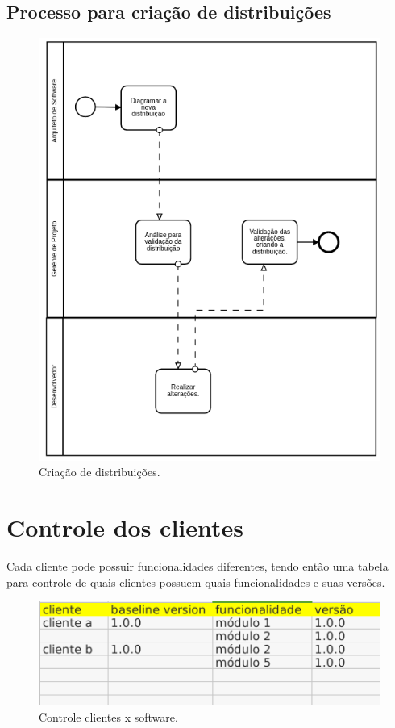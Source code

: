 \documentclass{article}
\begin{document}
        \subsection{Processo para criação de distribuições}
			\begin{figure}[H]
				\centering
				\includegraphics[width=0.7\linewidth]{processo_criacao_distribuicao}
				\caption{Criação de distribuições.}
				\label{fig:processocriacaodistribuicao}
			\end{figure}

    \section{Controle dos clientes}
    Cada cliente pode possuir funcionalidades diferentes, tendo então uma tabela para controle de quais clientes possuem quais funcionalidades e suas versões.
        \begin{figure}[H]
			\centering
			\includegraphics[width=0.7\linewidth]{controle_cliente_software.png}
			\caption{Controle clientes x software.}
			\label{fig:controleclientesoftware}
		\end{figure}
        
    \newpage
	\begin{appendix}
		\listoffigures
		\listoftables
	\end{appendix}
\end{document}
